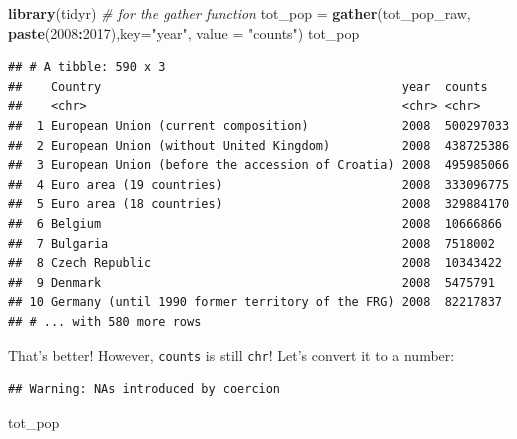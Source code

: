 \documentclass[]{book}
\newenvironment{Shaded}{\begin{snugshade}}{\end{snugshade}}
\newcommand{\KeywordTok}[1]{\textcolor[rgb]{0.13,0.29,0.53}{\textbf{#1}}}
\newcommand{\DataTypeTok}[1]{\textcolor[rgb]{0.13,0.29,0.53}{#1}}
\newcommand{\DecValTok}[1]{\textcolor[rgb]{0.00,0.00,0.81}{#1}}
\newcommand{\StringTok}[1]{\textcolor[rgb]{0.31,0.60,0.02}{#1}}
\newcommand{\CommentTok}[1]{\textcolor[rgb]{0.56,0.35,0.01}{\textit{#1}}}
\newcommand{\OperatorTok}[1]{\textcolor[rgb]{0.81,0.36,0.00}{\textbf{#1}}}
\newcommand{\NormalTok}[1]{#1}
\begin{document}
\begin{Shaded}
\begin{Highlighting}[]
\KeywordTok{library}\NormalTok{(tidyr)   }\CommentTok{# for the gather function}
\NormalTok{tot_pop =}\StringTok{ }\KeywordTok{gather}\NormalTok{(tot_pop_raw, }\KeywordTok{paste}\NormalTok{(}\DecValTok{2008}\OperatorTok{:}\DecValTok{2017}\NormalTok{),}\DataTypeTok{key=}\StringTok{"year"}\NormalTok{, }\DataTypeTok{value =} \StringTok{"counts"}\NormalTok{)}
\NormalTok{tot_pop}
\end{Highlighting}
\end{Shaded}

\begin{verbatim}
## # A tibble: 590 x 3
##    Country                                          year  counts   
##    <chr>                                            <chr> <chr>    
##  1 European Union (current composition)             2008  500297033
##  2 European Union (without United Kingdom)          2008  438725386
##  3 European Union (before the accession of Croatia) 2008  495985066
##  4 Euro area (19 countries)                         2008  333096775
##  5 Euro area (18 countries)                         2008  329884170
##  6 Belgium                                          2008  10666866 
##  7 Bulgaria                                         2008  7518002  
##  8 Czech Republic                                   2008  10343422 
##  9 Denmark                                          2008  5475791  
## 10 Germany (until 1990 former territory of the FRG) 2008  82217837 
## # ... with 580 more rows
\end{verbatim}

That's better! However, \texttt{counts} is still \texttt{chr}! Let's
convert it to a number:

\begin{Shaded}
\end{Shaded}

\begin{verbatim}
## Warning: NAs introduced by coercion
\end{verbatim}

\begin{Shaded}
\begin{Highlighting}[]
\NormalTok{tot_pop}
\end{Highlighting}
\end{Shaded}
\end{document}
